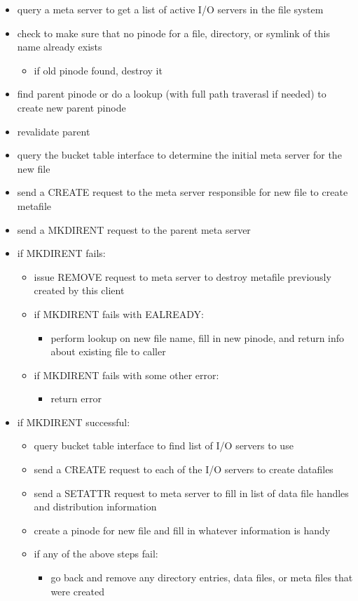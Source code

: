 \documentclass[11pt, letterpaper]{article}
\begin{document}
\begin{itemize}
\item query a meta server to get a list of active I/O servers in the
file system
\item check to make sure that no pinode for a file, directory, or
symlink of this name already exists
\begin{itemize}
\item if old pinode found, destroy it
\end{itemize}
\item find parent pinode or do a lookup (with full path traverasl if needed) 
to create new parent pinode
\item revalidate parent
\item query the bucket table interface to determine the initial meta server for
the new file
\item send a CREATE request to the meta server responsible for new file
to create metafile
\item send a MKDIRENT request to the parent meta server
\item if MKDIRENT fails:
\begin{itemize}
\item issue REMOVE request to meta server to destroy metafile previously
created by this client
\item if MKDIRENT fails with EALREADY:
\begin{itemize}
\item perform lookup on new file name, fill in new pinode, and return 
info about existing file to caller
\end{itemize}
\item if MKDIRENT fails with some other error:
\begin{itemize}
\item return error
\end{itemize}
\end{itemize}
\item if MKDIRENT successful:
\begin{itemize}
\item query bucket table interface to find list of I/O servers to
use
\item send a CREATE request to each of the I/O servers to create
datafiles
\item send a SETATTR request to meta server to fill in list of data file
handles and distribution information
\item create a pinode for new file and fill in whatever information is
handy
\item if any of the above steps fail:
\begin{itemize}
\item go back and remove any directory entries, data files, or meta
files that were created
\end{itemize}
\end{itemize}
\end{itemize}
\end{document}
